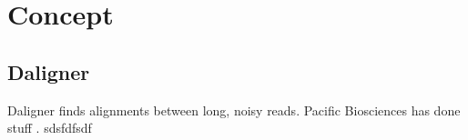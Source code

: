 \chapter{Concept}
\acresetall

\section{Daligner}
Daligner finds alignments between long, noisy reads. Pacific Biosciences \cite{PBlaunch1} has done stuff \cite{latexcompanion}.
sdsfdfsdf
